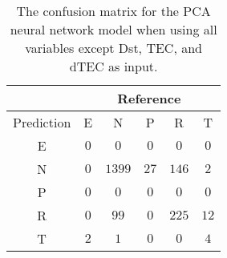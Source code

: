 \begin{table}[!ht]
	\centering
	\begin{tabular}{|c|c|c|c|c|c|}
		\hline
		 & \multicolumn{5}{|c|}{Reference} \\ \hline
		 Prediction & E & N & P & R & T \\ \hline
		 E & $0$ & $0$ & $0$ & $0$ & $0$ \\ \hline
		 N & $0$ & $1399$ & $27$ & $146$ & $2$ \\ \hline
		 P & $0$ & $0$ & $0$ & $0$ & $0$ \\ \hline
		 R & $0$ & $99$ & $0$ & $225$ & $12$ \\ \hline
		 T & $2$ & $1$ & $0$ & $0$ & $4$ \\ \hline
	\end{tabular}
	\caption{The confusion matrix for the PCA neural network model when using all variables except Dst, TEC, and dTEC as input.}
	\label{tab:cm:noTEC:pcaNNet}
\end{table}
